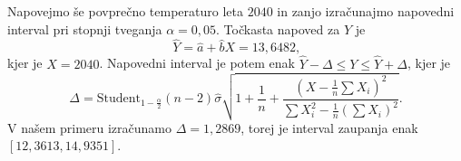 \documentclass{article}
\begin{document}
Napovejmo še povprečno temperaturo leta $2040$ in zanjo izračunajmo napovedni interval pri stopnji tveganja $\alpha = 0{,}05$.
Točkasta napoved za $Y$ je
\begin{equation}
    \label{napoved}
    \hat{Y} = \hat{a} + \hat{b} X = 13,6482 \text{,}
\end{equation}
kjer je $X = 2040$. Napovedni interval je potem enak $\hat{Y} - \Delta \leq Y \leq \hat{Y} + \Delta$,
kjer je 
\begin{equation}
    \label{Delta}
    \Delta = \text{Student}_{1 - \frac{\alpha}{2}} \left( n - 2 \right) \hat{\sigma} \sqrt{1 + \frac{1}{n} + \frac{\left( X - \frac{1}{n} \sum X_i \right)^2}{\sum X_i^2 - \frac{1}{n} \left( \sum X_i \right)^2}} \text{.}
\end{equation}
V našem primeru izračunamo $\Delta = 1{,}2869$, torej je interval zaupanja enak $ \left[ 12{,}3613, 14{,}9351 \right]$.
\end{document}
